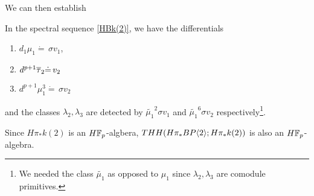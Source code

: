 We can then establish
\begin{prop}
	In the spectral sequence \eqref{HBk(2)}, we have the differentials 
	\begin{enumerate}
		\item $d_1\mu_1\dot{=}\, \sigma v_1$,
		\item $d^{p+1}\overline{\tau}_2\dot{=}\, v_2$
		\item $d^{p+1}\mu_1^3\dot{=}\, \sigma v_2$
	\end{enumerate}
and the classes $\lambda_2, \lambda_3$ are detected by $\widetilde{\mu_1}^2\sigma v_1$ and $\widetilde{\mu_1}^6\sigma v_2$ respectively\footnote{We needed the class $\widetilde{\mu_1}$ as opposed to $\mu_1$ since $\lambda_2, \lambda_3$ are comodule primitives.}.
\end{prop}
Since $H\pi_*k(2)$ is an $H\mathbb{F}_p$-algbera, $THH(H\pi_*BP\langle 2 \rangle;H\pi_*k(2))$ is also an $H\mathbb{F}_p$-algebra.
\begin{comment}
Smashing the cofibre sequence for $V(1)$ with $H\Z$ shows that 
\begin{equation}\label{eqn: V(1) smash HZ}
V(1)\wedge H\Z\simeq_{H\F_p} H\F_3\vee \Sigma^5 H\F_3,
\end{equation}
in particular, $V(1)\wedge H\Z$ is an $H\F_p$-module. Thus $V(1)\wedge \THH(H\pi_*\B)$ is an $H\F_p$-module. So the Hurewicz map
\[
\pi_*(V(1)\wedge \THH(H\pi_*\B)\to H_*(V(1)\wedge \THH(H\pi_*\B)
\]
is injective onto the comodule primitives. Similarly to the $V(0)$-May spectral sequence, we pull-back differentials to understand the $V(1)$-May spectral sequence. There is one fundamental distinction from the previous section, however. Namely, there will be a differential which kills $v_1$ in the $V(1)$-May spectral sequence. This will keep the map on the $E^2$, $E^3$, and $E^4$-pages induced by the Hurewicz map injective, bypassing the difficulties of the previous section. We proceed to show this below. 

Observe that 
\[
H_*(V(1)\wedge H\Z)\cong E(\widetilde{\tau_0}, \widetilde{\tau_1})\otimes \AE{0}.
\]
From \eqref{eqn: V(1) smash HZ}, we conclude that 
\[
H_*(V(1)\wedge H\Z)\cong A_*\oplus A_*\{\varepsilon_1\}
\] 
on some comodule primitive $\varepsilon_1$. We will identify this element $\varepsilon_1$ and show that $d^1\varepsilon_1=v_1$. 
\end{comment}
